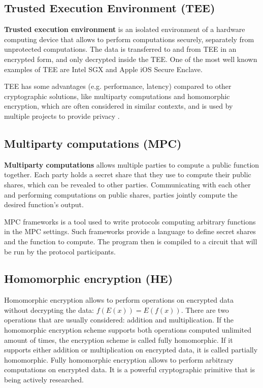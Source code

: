 \documentclass[final]{msc}
\begin{document}
\subsection{Trusted Execution Environment (TEE)}

\textbf{Trusted execution environment} is an isolated environment of a hardware computing device that allows to perform computations securely, separately from unprotected computations. The data is transferred to and from TEE in an encrypted form, and only decrypted inside the TEE. One of the most well known examples of TEE are Intel SGX and Apple iOS Secure Enclave. 

TEE has some advantages (e.g. performance, latency) compared to other cryptographic solutions, like multiparty computations and homomorphic encryption, which are often considered in similar contexts, and is used by multiple projects to provide privacy \cite{flash} \cite{secret}.

\subsection{Multiparty computations (MPC)}

\textbf{Multiparty computations} allows multiple parties to compute a public function together. Each party holds a secret share that they use to compute their public shares, which can be revealed to other parties. Communicating with each other and performing computations on public shares, parties jointly compute the desired function's output. 

MPC frameworks is a tool used to write protocols computing arbitrary functions in the MPC settings. Such frameworks provide a language to define secret shares and the function to compute. The program then is compiled to a circuit that will be run by the protocol participants.

\subsection{Homomorphic encryption (HE)}

Homomorphic encryption allows to perform operations on encrypted data without decrypting the data: $f(E(x)) = E(f(x))$. There are two operations that are usually considered: addition and multiplication. If the homomorphic encryption scheme supports both operations computed unlimited amount of times, the encryption scheme is called fully homomorphic. If it supports either addition or multiplication on encrypted data, it is called partially homomorphic. Fully homomorphic encryption allows to perform arbitrary computations on encrypted data. It is a powerful cryptographic primitive that is being actively researched.
\end{document}

